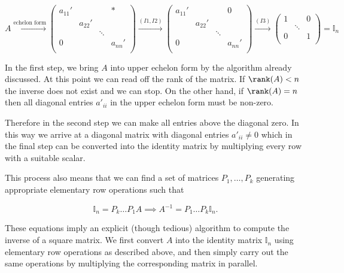\documentclass[a4paper,12pt]{report}
\begin{document}
\begin{equation}
    A \xrightarrow{\text{echelon form} } \begin{pmatrix}
        a_{11}'  &  &  & * \\
         & a_{22}'  &  &   \\
         &  & \ddots  &   \\
        0 &  &  & a_{nn}'   \\
    \end{pmatrix} \xrightarrow{(I1,I2)}  \begin{pmatrix}
        a_{11}'  &  &  & 0 \\
         & a_{22}'  &  &   \\
         &  & \ddots  &   \\
        0 &  &  & a_{nn}'   \\
    \end{pmatrix} \xrightarrow{(I3)} \begin{pmatrix}
        1 &  & 0  \\
         & \ddots  &   \\
        0 &  & 1 \\
    \end{pmatrix} = \mathbb{I}_{n} 
\end{equation}

In the first step, we bring \(A\) into upper echelon form by the algorithm already discussed. At this point we can read off the rank of the matrix. If \(\rank (A)<n\) the inverse does not exist and we can stop. On the other hand, if \(\rank (A) = n\) then all diagonal entries \(a'_{ii} \) in the upper echelon form must be non-zero.

Therefore in the second step we can make all entries above the diagonal zero. In this way we arrive at a diagonal matrix with diagonal entries \(a'_{ii} \neq 0 \) which in the final step can be converted into the identity matrix by multiplying every row with a suitable scalar. 

This process also means that we can find a set of matrices \(P_{1} ,\ldots ,P_{k}\) generating appropriate elementary row operations such that 

\begin{equation}
    \mathbb{I}_{n} = P_{k} \ldots P_{1}A \implies A^{-1} = P_{1} \ldots P_{k} \mathbb{I}_{n}.    
\end{equation}

These equations imply an explicit (though tedious) algorithm to compute the inverse of a square matrix. We first convert \(A\) into the identity matrix \(\mathbb{I}_{n} \) using elementary row operations as described above, and then simply carry out the same operations by multiplying the corresponding matrix in parallel. 
\end{document}
